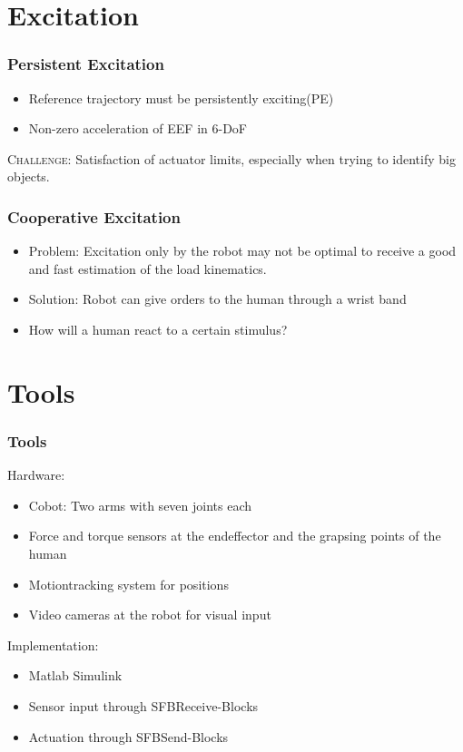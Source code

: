 \documentclass[student,noshadow]{ITRslides}
\begin{document}
\section{Excitation}
\begin{frame}
	\frametitle{Persistent Excitation}
	\vspace{1cm}	
	\begin{itemize}
		\item Reference trajectory must be persistently exciting(PE)
		\item Non-zero acceleration of EEF in 6-DoF \cite{literaturstelle3}
	\end{itemize}
	\vspace{1cm}
	\textsc{Challenge}: Satisfaction of actuator limits, especially when trying to identify big objects.
\end{frame}
\begin{frame}
	\frametitle{Cooperative Excitation}	
	\begin{itemize}
		\item Problem: Excitation only by the robot may not be optimal to receive a good and fast estimation of the load kinematics.
		\item Solution: Robot can give orders to the human through a wrist band
		\item How will a human react to a certain stimulus?		
	\end{itemize}
\end{frame}

\section{Tools}
\begin{frame}
	\frametitle{Tools}
	Hardware:
	\begin{itemize}
		\item Cobot: Two arms with seven joints each
		\item Force and torque sensors at the endeffector and the grapsing points of the human
		\item Motiontracking system for positions
		\item Video cameras at the robot for visual input
	\end{itemize}
	\vspace{0.5cm}
	Implementation:
	\begin{itemize}
		\item Matlab Simulink
		\item Sensor input through SFBReceive-Blocks
		\item Actuation through SFBSend-Blocks
	\end{itemize}
\end{frame}
\end{document}
